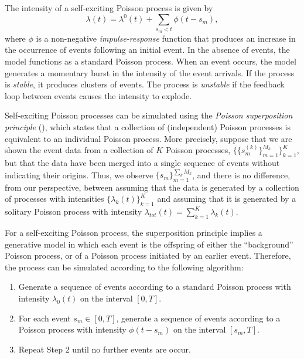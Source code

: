 The intensity of a self-exciting Poisson process is given by
\begin{equation}
	\lambda(t) = \lambda^0(t) + \sum_{s_m < t} \phi(t - s_m),
\end{equation}
where $\phi$ is a non-negative \textit{impulse-response} function that produces an increase in the occurrence of events following an initial event. In the absence of events, the model functions as a standard Poisson process. When an event occurs, the model generates a momentary burst in the intensity of the event arrivals. If the process is \textit{stable}, it produces clusters of events. The process is \textit{unstable} if the feedback loop between events causes the intensity to explode.

Self-exciting Poisson processes can be simulated using the \textit{Poisson superposition principle} (\cite{Kingman1993}), which states that a collection of (independent) Poisson processes is equivalent to an individual Poisson process. More precisely, suppose that we are shown the event data from a collection of $K$ Poisson processes, $\{ \{ s_m^{(k)} \}_{m=1}^{M_k} \}_{k=1}^K$, but that the data have been merged into a single sequence of events without indicating their origins. Thus, we observe $\{ s_m \}_{m=1}^{\sum_k M_k}$, and there is no difference, from our perspective, between assuming that the data is generated by a collection of processes with intensities $\{\lambda_k(t)\}_{k=1}^K$ and assuming that it is generated by a solitary Poisson process with intensity $\lambda_{tot}(t) = \sum_{k=1}^K \lambda_k(t)$.

For a self-exciting Poisson process, the superposition principle implies a generative model in which each event is the offspring of either the ``background'' Poisson process, or of a Poisson process initiated by an earlier event. Therefore, the process can be simulated according to the following algorithm:
\begin{enumerate}
	\item Generate a sequence of events according to a standard Poisson process with intensity $\lambda_0(t)$ on the interval $[0,T]$.
	\item For each event $s_m \in [0, T]$, generate a sequence of events according to a Poisson process with intensity $\phi(t - s_m)$ on the interval $[s_m, T]$.
	\item Repeat Step 2 until no further events are occur.
\end{enumerate}

